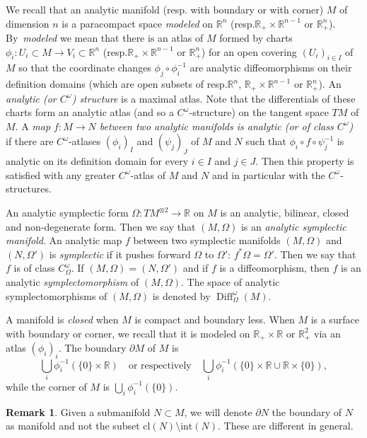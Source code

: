 \documentclass[11pt]{article}
\newcommand{\resp}{resp.\xspace}
\newcommand{\cl}{\mathrm{cl}}
\newcommand{\Int}{\mathrm{int}}
\newcommand\R{\mathbb R}
\DeclareMathOperator\Diff{Diff}
\theoremstyle{definition}
\newtheorem{remark}[proposition]{Remark}
\begin{document}
We recall that an analytic manifold (\resp with boundary or with corner) $M$ of dimension $n$ is a paracompact space \emph{modeled} on $\R^n$ (\resp $\R_+\times \R^{n-1}$ or $\R_+^n$). By~\emph{modeled} we mean that there is an atlas of $M$ formed by charts $\phi_i: U_i\subset M\to V_i\subset \R^n$ (\resp $\R_+\times \R^{n-1}$ or $\R_+^n$) for an open covering $(U_i)_{i\in I}$ of $M$ so that the coordinate changes $\phi_j\circ \phi^{-1}_i$ are analytic diffeomorphisms on their definition domains (which are open subsets of \resp $\R^n$, $\R_+\times \R^{n-1}$ or $\R_+^n$). An \emph{analytic (or $C^\omega$) structure} is a maximal atlas. Note that the differentials of these charts form an analytic atlas (and so a $C^\omega$-structure) on the tangent space $TM$ of $M$. A \emph{map $f: M\to N$ between two analytic manifolds is analytic (or of class $C^\omega$)} if there are $C^\omega$-atlases $(\phi_i)_{I}$ and $(\psi_j)_{J}$ of $M$ and $N$ such that $\phi_i\circ f\circ \psi^{-1}_j$ is analytic on its definition domain for every $i\in I$ and $j\in J$. Then this property is satisfied with any greater $C^\omega$-atlas of $M$ and $N$ and in particular with the $C^\omega$-structures.

An analytic symplectic form $\Omega:TM^{\otimes 2}\to \R$ on $M$ is an analytic, bilinear, closed and non-degenerate form. Then we say that $(M,\Omega)$ is an \emph{analytic symplectic manifold}.
An analytic map $f$ between two symplectic manifolds $(M,\Omega)$ and $(N,\Omega')$ is \emph{symplectic} if it pushes forward $\Omega$ to $\Omega'$: $f^*\Omega = \Omega'$. Then we say that $f$ is of class $C^\omega_\Omega$. If $(M,\Omega)=(N, \Omega')$ and if $f$ is a diffeomorphism, then $f$ is an analytic \emph{symplectomorphism} of $(M,\Omega)$. The space of analytic symplectomorphisms of $(M,\Omega)$ is denoted by $\Diff^\omega_\Omega(M)$.

A manifold is \emph{closed} when $M$ is compact and boundary less.
When $M$ is a surface with boundary or corner, we recall that it is modeled on $\R_+\times \R$ or $\R_+^2$ via an atlas $(\phi_i)_i$.
The boundary $\partial M$ of $M$ is
\[
\bigcup_i \phi^{-1}_i(\{0\}\times \R)\quad\text{or respectively}\quad \bigcup_i \phi^{-1}_i(\{0\}\times \R\cup \R\times \{0\}),
\]
while the corner of $M$ is $\bigcup_i \phi^{-1}_i(\{0\})$.
\begin{remark}
Given a submanifold $N \subset M$, we will denote $\partial N$ the boundary of $N$ as manifold and not the subset $\cl(N) \setminus \Int(N)$. These are different in general.
\end{remark}
\end{document}
